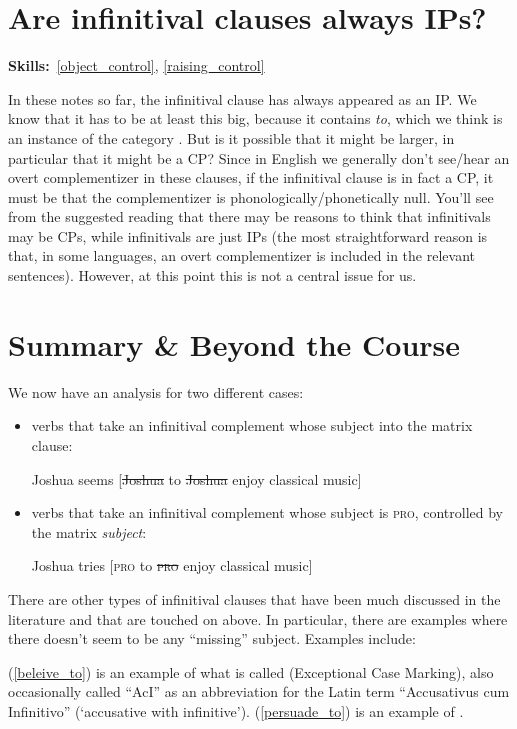 \documentclass{article}
\begin{document}
\section{Are infinitival clauses always IPs?}
\hfill{}\textbf{Skills:}~\ref{object_control}, \ref{raising_control}

In these notes so far, the infinitival clause has always appeared as an IP.
We know that it has to be at least this big, because it contains \emph{to}, which we think is an instance of the category .
But is it possible that it might be larger, in particular that it might be a CP?
Since in English we generally don't see/hear an overt complementizer in these clauses, if the infinitival clause is in fact a CP, it must be that the complementizer is phonologically/phonetically null.
You'll see from the suggested reading that there may be reasons to think that  infinitivals may be CPs, while  infinitivals are just IPs (the most straightforward reason is that, in some languages, an overt complementizer is included in the relevant sentences).
However, at this point this is not a central issue for us. 

\newpage
\section{Summary \& Beyond the Course}

We now have an analysis for two different cases:
\begin{itemize}
\item {} verbs that take an infinitival complement whose subject  into the matrix clause:
\begin{exe}
    \ex Joshua seems [\sout{Joshua} to \sout{Joshua} enjoy classical music]
\end{exe}
\item {} verbs that take an infinitival complement whose subject is \textsc{pro}, controlled by the matrix \textit{subject}:
\begin{exe}
    \ex Joshua tries [\textsc{pro} to \sout{\textsc{pro}} enjoy classical music]
\end{exe}
\end{itemize}
There are other types of infinitival clauses that have been much discussed in the literature and that are touched on above.
In particular, there are examples where there doesn't seem to be any ``missing'' subject.
Examples include:
\begin{exe}
    \label{beleive_to}
    \label{persuade_to}
\end{exe}
(\ref{beleive_to}) is an example of what is called  (Exceptional Case Marking), also occasionally called ``AcI'' as an abbreviation for the Latin term ``Accusativus cum Infinitivo'' (`accusative with infinitive').
(\ref{persuade_to}) is an example of .
\end{document}
